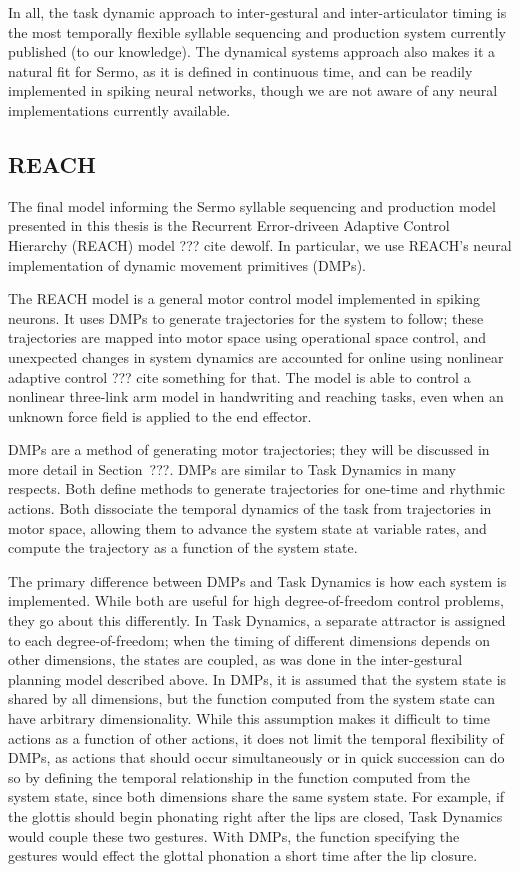 In all, the task dynamic approach
to inter-gestural and inter-articulator timing
is the most temporally flexible
syllable sequencing and production system
currently published
(to our knowledge).
The dynamical systems approach
also makes it a natural fit for Sermo,
as it is defined in continuous time,
and can be readily implemented
in spiking neural networks,
though we are not aware of any
neural implementations currently available.

\subsection{REACH}

The final model informing
the Sermo syllable sequencing
and production model presented
in this thesis is the
Recurrent Error-driveen Adaptive Control Hierarchy (REACH)
model ??? cite dewolf.
In particular, we use REACH's
neural implementation
of dynamic movement primitives (DMPs).

The REACH model is a general motor control
model implemented in spiking neurons.
It uses DMPs to generate trajectories
for the system to follow;
these trajectories are mapped into
motor space using operational space control,
and unexpected changes in system dynamics
are accounted for online
using nonlinear adaptive control
??? cite something for that.
The model is able to control
a nonlinear three-link arm model
in handwriting and reaching tasks,
even when an unknown force field
is applied to the end effector.

DMPs are a method of generating motor trajectories;
they will be discussed in more detail
in Section~???.
DMPs are similar to Task Dynamics in many respects.
Both define methods to generate trajectories
for one-time and rhythmic actions.
Both dissociate the temporal dynamics
of the task from trajectories
in motor space,
allowing them to advance the system state
at variable rates,
and compute the trajectory
as a function of the system state.

The primary difference between DMPs and Task Dynamics
is how each system is implemented.
While both are useful for high degree-of-freedom
control problems,
they go about this differently.
In Task Dynamics,
a separate attractor is assigned
to each degree-of-freedom;
when the timing of different
dimensions depends on other dimensions,
the states are coupled,
as was done in
the inter-gestural planning model
described above.
In DMPs,
it is assumed that the system state
is shared by all dimensions,
but the function computed
from the system state can
have arbitrary dimensionality.
While this assumption makes it
difficult to time actions
as a function of other actions,
it does not limit the temporal flexibility
of DMPs, as actions that should occur
simultaneously or in quick succession
can do so by defining the temporal relationship
in the function computed from the system state,
since both dimensions share the same system state.
For example,
if the glottis should begin phonating
right after the lips are closed,
Task Dynamics would couple these two gestures.
With DMPs, the function specifying the gestures
would effect the glottal phonation
a short time after the lip closure.

